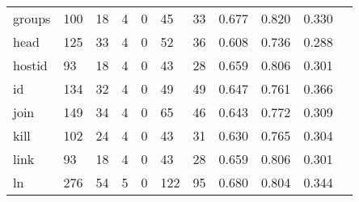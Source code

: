 \begin{longtable}{lp{1.10cm}p{1.10cm}p{1.10cm}p{1.10cm}p{1.10cm}p{1.10cm}p{1.10cm}p{1.10cm}p{1.10cm}p{1.10cm}}
groups    &                    100 &                                 18 &                                 4 &                                0 &                                45 &                              33 &                          0.677 &                                 0.820 &                               0.330 \\
head      &                    125 &                                 33 &                                 4 &                                0 &                                52 &                              36 &                          0.608 &                                 0.736 &                               0.288 \\
hostid    &                     93 &                                 18 &                                 4 &                                0 &                                43 &                              28 &                          0.659 &                                 0.806 &                               0.301 \\
id        &                    134 &                                 32 &                                 4 &                                0 &                                49 &                              49 &                          0.647 &                                 0.761 &                               0.366 \\
join      &                    149 &                                 34 &                                 4 &                                0 &                                65 &                              46 &                          0.643 &                                 0.772 &                               0.309 \\
kill      &                    102 &                                 24 &                                 4 &                                0 &                                43 &                              31 &                          0.630 &                                 0.765 &                               0.304 \\
link      &                     93 &                                 18 &                                 4 &                                0 &                                43 &                              28 &                          0.659 &                                 0.806 &                               0.301 \\
ln        &                    276 &                                 54 &                                 5 &                                0 &                               122 &                              95 &                          0.680 &                                 0.804 &                               0.344 \\

\end{longtable}
